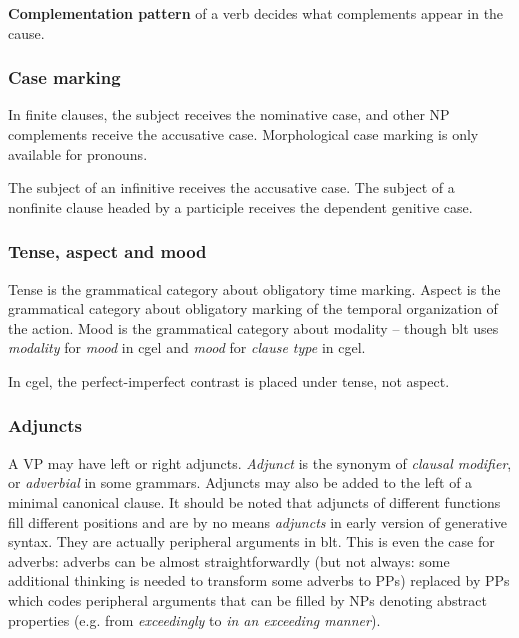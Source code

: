 \documentclass{article}
\newcommand*{\concept}[1]{\textbf{#1}}
\newcommand*{\term}[1]{\emph{#1}}
\newcommand*{\corpus}[1]{\emph{#1}}
\begin{document}
\concept{Complementation pattern} of a verb decides what complements appear in the cause.

\subsubsection{Case marking}\label{sec:case-marking-clause}

In finite clauses, the subject receives the nominative case, 
and other NP complements receive the accusative case.
Morphological case marking is only available for pronouns.

The subject of an infinitive receives the accusative case.
The subject of a nonfinite clause headed by a participle 
receives the dependent genitive case.

\subsubsection{Tense, aspect and mood}\label{sec:tense-aspect}

Tense is the grammatical category about obligatory time marking.
Aspect is the grammatical category about obligatory marking of the temporal organization of the action.
Mood is the grammatical category about modality -- 
though \ac{blt} uses \term{modality} for \term{mood} in \ac{cgel} 
and \term{mood} for \term{clause type} in \ac{cgel}.

In \ac{cgel}, the perfect-imperfect contrast is placed under tense, not aspect.

\subsubsection{Adjuncts}\label{sec:adjunct}

A VP may have left or right adjuncts. 
\term{Adjunct} is the synonym of \term{clausal modifier},
or \term{adverbial} in some grammars.
Adjuncts may also be added to the left of a minimal canonical clause.
It should be noted that adjuncts of different functions fill different positions
and are by no means \term{adjuncts} in early version of generative syntax.
They are actually peripheral arguments in \ac{blt}.
This is even the case for adverbs: 
adverbs can be almost straightforwardly 
(but not always: some additional thinking is needed to transform some adverbs to PPs) 
replaced by PPs which codes peripheral arguments 
that can be filled by NPs denoting abstract properties
(e.g. from \corpus{exceedingly} to \corpus{in an exceeding manner}).
\end{document}
